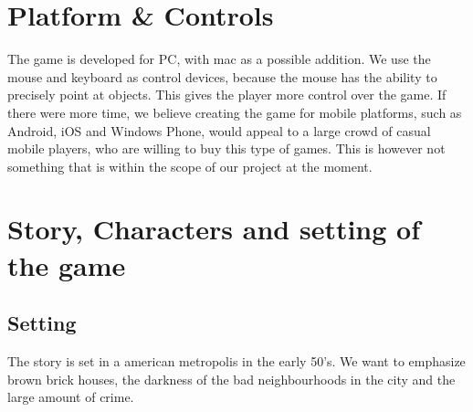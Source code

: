 \documentclass{article}
\begin{document}
\section{Platform \& Controls}
	The game is developed for PC, with mac as a possible addition. We use the mouse and keyboard as control devices, because the mouse has the ability to precisely point at objects. This gives the player more control over the game. If there were more time, we believe creating the game for mobile platforms, such as Android, iOS and Windows Phone, would appeal to a large crowd of casual mobile players, who are willing to buy this type of games. This is however not something that is within the scope of our project at the moment.

\section{Story, Characters and setting of the game}
	\subsection{Setting}
		The story is set in a american metropolis in the early 50's. We want to emphasize brown brick houses, the darkness of the bad neighbourhoods in the city and the large amount of crime. 
\end{document}
